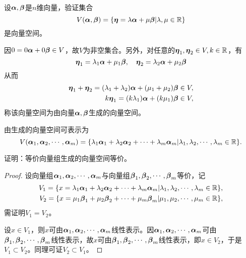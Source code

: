 \begin{frame}\ft{\secname}

\begin{li}
  设$\boldsymbol{\alpha},\boldsymbol{\beta}$是$n$维向量，验证集合
  $$
  V(\boldsymbol{\alpha},\boldsymbol{\beta})=\{\boldsymbol{\eta}=\lambda\boldsymbol{\alpha}+\mu\boldsymbol{\beta}|\lambda,\mu\in\mathbb R\}
  $$
  是向量空间。
\end{li} \pause 
\begin{jie}
  因$0=0\boldsymbol{\alpha}+0\boldsymbol{\beta}\in V$，故$V$为非空集合。另外，对任意的$\boldsymbol{\eta}_1,\boldsymbol{\eta}_2\in V, k\in \mathbb R$，有
  $$
  \boldsymbol{\eta}_1=\lambda_1\boldsymbol{\alpha}+\mu_1\boldsymbol{\beta}, \quad
  \boldsymbol{\eta}_2=\lambda_2\boldsymbol{\alpha}+\mu_2\boldsymbol{\beta}
  $$
  从而
  $$
  \begin{aligned}
    \boldsymbol{\eta}_1+\boldsymbol{\eta}_2=(\lambda_1+\lambda_2)\boldsymbol{\alpha}+(\mu_1+\mu_2)\boldsymbol{\beta}\in V,\\
    k\boldsymbol{\eta}_1=(k\lambda_1)\boldsymbol{\alpha}+(k\mu_1)\boldsymbol{\beta}\in V,
  \end{aligned}
  $$
  称该向量空间为由向量$\boldsymbol{\alpha},\boldsymbol{\beta}$生成的向量空间。
\end{jie}
\end{frame}

\begin{frame}\ft{\secname}

\begin{dingyi}
  由生成的向量空间可表示为
  $$
  V(\boldsymbol{\alpha}_1,\boldsymbol{\alpha}_2,\cdots,\boldsymbol{\alpha}_m)=\{\lambda_1\boldsymbol{\alpha}_1+\lambda_2\boldsymbol{\alpha}_2+\cdots+\lambda_m\boldsymbol{\alpha}_m|\lambda_1,\lambda_2,\cdots,\lambda_m\in \mathbb R\}.
  $$
\end{dingyi}
\end{frame}

\begin{frame}\ft{\secname}

\begin{li}
证明：等价向量组生成的向量空间等价。
\end{li} \pause 
\begin{proof}
  设向量组$\boldsymbol{\alpha}_1,\boldsymbol{\alpha}_2,\cdots,\boldsymbol{\alpha}_m$与向量组$\boldsymbol{\beta}_1,\boldsymbol{\beta}_2,\cdots,\boldsymbol{\beta}_m$等价，记
  $$
  \begin{aligned}
    V_1=\{x=\lambda_1\boldsymbol{\alpha}_1+\lambda_2\boldsymbol{\alpha}_2+\cdots+\lambda_m\boldsymbol{\alpha}_m|\lambda_1,\lambda_2,\cdots,\lambda_m\in \mathbb R\},\\
    V_2=\{x=\mu_1\boldsymbol{\beta}_1+\mu_2\boldsymbol{\beta}_2+\cdots+\mu_m\boldsymbol{\beta}_m|\mu_1,\mu_2,\cdots,\mu_m\in \mathbb R\},
  \end{aligned}
  $$
  需证明$V_1=V_2$。 \pause 

  设$x\in V_1$，则$x$可由$\boldsymbol{\alpha}_1,\boldsymbol{\alpha}_2,\cdots,\boldsymbol{\alpha}_m$线性表示。因$\boldsymbol{\alpha}_1,\boldsymbol{\alpha}_2,\cdots,\boldsymbol{\alpha}_m$可由$\boldsymbol{\beta}_1,\boldsymbol{\beta}_2,\cdots,\boldsymbol{\beta}_m$线性表示，故$x$可由$\boldsymbol{\beta}_1,\boldsymbol{\beta}_2,\cdots,\boldsymbol{\beta}_m$线性表示，即$x\in V_2$，于是$V_1\subset V_2$。同理可证$V_2\subset V_1$。
\end{proof}

\end{frame}